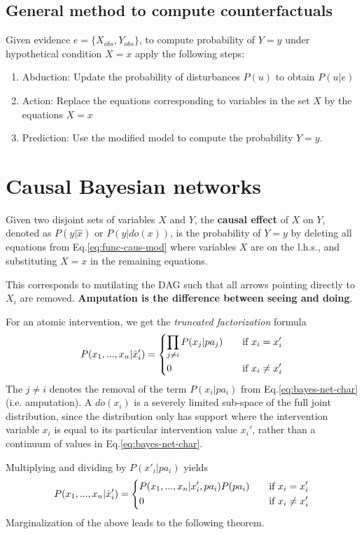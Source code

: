 \documentclass[11pt]{article}
\numberwithin{equation}{section}
\begin{document}
\subsection{General method to compute counterfactuals}
Given evidence $e=\{X_{obs}, Y_{obs}\}$, to compute probability of $Y=y$ under hypothetical condition $X=x$ apply the following steps:
\begin{enumerate}[noitemsep]
\item Abduction: Update the probability of disturbances $P(u)$ to obtain $P(u|e)$
\item Action: Replace the equations corresponding to variables in the set $X$ by the equations $X=x$
\item Prediction: Use the modified model to compute the probability $Y=y$.
\end{enumerate}

\section{Causal Bayesian networks}
Given two disjoint sets of variables $X$ and $Y$, the \textbf{causal effect} of $X$ on $Y$, denoted as $P(y|\hat{x})$ or $P(y|do(x))$, is the probability of $Y=y$ by deleting all equations from Eq.\eqref{eq:func-caus-mod} where variables $X$ are on the l.h.s., and substituting $X=x$ in the remaining equations.

This corresponds to mutilating the DAG such that all arrows pointing directly to $X_i$ are removed. \textbf{Amputation is the difference between seeing and doing}.

For an atomic intervention, we get the \textit{truncated factorization} formula
\begin{equation}
P(x_1,...,x_n|\hat{x}'_i)=\begin{dcases}
\prod_{j\neq i} P(x_j|pa_j) \quad &\text{if}\ x_i = x_i'\\
0 &\text{if}\ x_i \neq x_i'
\end{dcases}
\end{equation}
The $j\neq i$ denotes the removal of the term $P(x_i|pa_i)$ from Eq.\eqref{eq:bayes-net-char} (i.e. amputation). A $do(x_i)$ is a severely limited sub-space of the full joint distribution, since the distribution only has support where the intervention variable $x_i$ is equal to its particular intervention value $x_i'$, rather than a continuum of values in Eq.\eqref{eq:bayes-net-char}.

Multiplying and dividing by $P(x'_i|pa_i)$ yields
\begin{equation}
P(x_1,...,x_n|\hat{x}'_i)=\begin{dcases}
P(x_1,...,x_n|x_i',pa_i)P(pa_i) \quad &\text{if}\ x_i = x_i'\\
0 &\text{if}\ x_i \neq x_i'
\end{dcases}
\end{equation}
Marginalization of the above leads to the following theorem.
\end{document}
